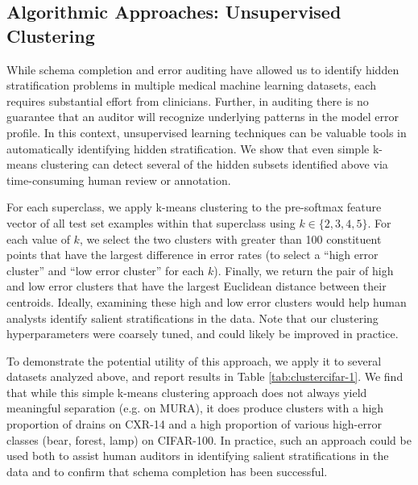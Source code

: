 \documentclass[sigconf,anonymous,review]{acmart}
\begin{document}
\subsection{Algorithmic Approaches: Unsupervised Clustering}

While schema completion and error auditing have allowed us to identify hidden stratification problems in multiple medical machine learning datasets, each requires substantial effort from clinicians.
Further, in auditing there is no guarantee that an auditor will recognize underlying patterns in the model error profile.
In this context, unsupervised learning techniques can be valuable tools in automatically identifying hidden stratification.
We show that even simple k-means clustering can detect several of the hidden subsets identified above via time-consuming human review or annotation.

For each superclass, we apply k-means clustering to the pre-softmax feature vector of all test set examples within that superclass using $k \in \{2,3,4,5\}$.
For each value of $k$, we select the two clusters with greater than 100 constituent points that have the largest difference in error rates (to select a ``high error cluster'' and ``low error cluster'' for each $k$).
Finally, we return the pair of high and low error clusters that have the largest Euclidean distance between their centroids.
Ideally, examining these high and low error clusters would help human analysts identify salient stratifications in the data.
Note that our clustering hyperparameters were coarsely tuned, and could likely be improved in practice.

To demonstrate the potential utility of this approach, we apply it to several datasets analyzed above, and report results in Table \ref{tab:clustercifar-1}.  
We find that while this simple k-means clustering approach does not always yield meaningful separation (e.g. on MURA), it does produce clusters with a high proportion of drains on CXR-14 and a high proportion of various high-error classes (bear, forest, lamp) on CIFAR-100.  
 In practice, such an approach could be used both to assist human auditors in identifying salient stratifications in the data and to confirm that schema completion has been successful.
\end{document}
